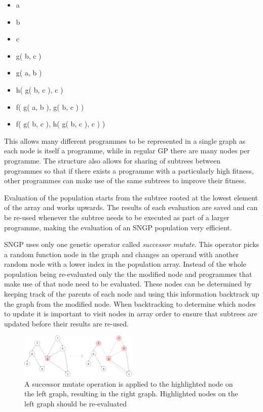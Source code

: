 \documentclass{article}
\begin{document}
			\begin{multicols}{2}
			\begin{itemize}
				\item a
				\item b
				\item c
				\item g( b, c )
				\item g( a, b )
				\item h( g( b, c ), c )
				\item f( g( a, b ), g( b, c ) )
				\item f( g( b, c ), h( g( b, c ), c ) )
			\end{itemize}
			\end{multicols}
		
			This allows many different programmes to be represented in a single graph as each node is itself a programme, while in regular GP there are many nodes per programme. The structure also allows for sharing of subtrees between programmes so that if there exists a programme with a particularly high fitness, other programmes can make use of the same subtrees to improve their fitness.
			
			Evaluation of the population starts from the subtree rooted at the lowest element of the array and works upwards. The results of each evaluation are saved and can be re-used whenever the subtree needs to be executed as part of a larger programme, making the evaluation of an SNGP population very efficient.
			
			SNGP uses only one genetic operator called \textit{successor mutate}. This operator picks a random function node in the graph and changes an operand with another random node with a lower index in the population array. Instead of the whole population being re-evaluated only the the modified node and programmes that make use of that node need to be evaluated. These nodes can be determined by keeping track of the parents of each node and using this information backtrack up the graph from the modified node. When backtracking to determine which nodes to update it is important to visit nodes in array order to ensure that subtrees are updated before their results are re-used.
			
			\begin{figure}[h]
				\centering
				\includegraphics[width=0.5\textwidth]{10_successor_mutate}
				\caption{A successor mutate operation is applied to the highlighted node on the left graph, resulting in the right graph. Highlighted nodes on the left graph should be re-evaluated}
				\label{fig:successor_mut}
			\end{figure}
			
\end{document}
